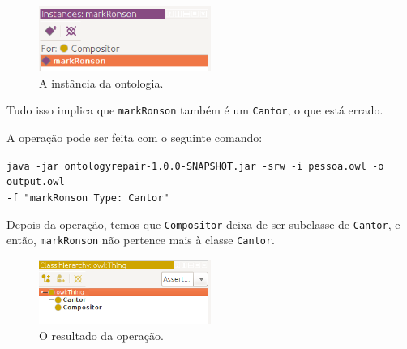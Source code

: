 \begin{figure}[H]
	\centering
	\includegraphics[width=0.5\textwidth]{Capitulos/Implementacao/srw2.png}
	\caption{A instância da ontologia.}
\end{figure}

Tudo isso implica que \texttt{markRonson} também é um \texttt{Cantor}, o que está errado. 

A operação pode ser feita com o seguinte comando:

\begin{small}
	\texttt{java -jar ontologyrepair-1.0.0-SNAPSHOT.jar -srw -i pessoa.owl -o output.owl \\ -f "markRonson Type: Cantor"}
\end{small}

Depois da operação, temos que \texttt{Compositor} deixa de ser subclasse de \texttt{Cantor}, e então, \texttt{markRonson} não pertence mais à classe \texttt{Cantor}.

\begin{figure}[H]
	\centering
	\includegraphics[width=0.5\textwidth]{Capitulos/Implementacao/srw3.png}
	\caption{O resultado da operação.}
\end{figure}
